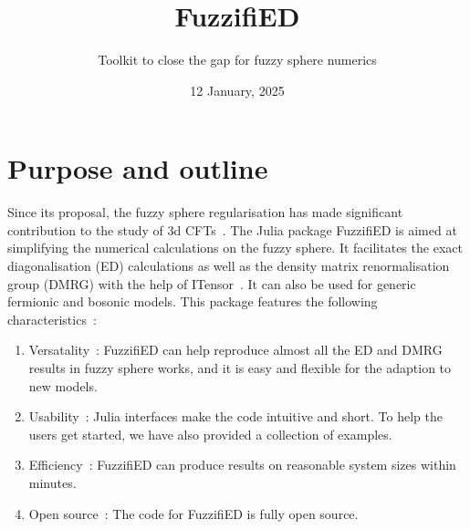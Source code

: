 \documentclass{timesjhep}
\title{FuzzifiED}
\subtitle{Toolkit to close the gap for fuzzy sphere numerics}
\date{12 January, 2025}
\begin{document}
\maketitle

\section{Purpose and outline}

Since its proposal, the fuzzy sphere regularisation has made significant contribution to the study of 3d CFTs~\cite{Zhu2022,Hu2023Mar,Han2023Jun,Zhou2023,Lao2023,Hu2023Aug,Hofmann2023,Han2023Dec,Zhou2024Jan,Hu2024,Cuomo2024,Zhou2024Jul,Dedushenko2024,Fardelli2024,Fan2024,Zhou2024Oct,Voinea2024}. The Julia package FuzzifiED is aimed at simplifying the numerical calculations on the fuzzy sphere. It facilitates the exact diagonalisation (ED) calculations as well as the density matrix renormalisation group (DMRG) with the help of ITensor~\cite{ITensor}. It can also be used for generic fermionic and bosonic models. This package features the following characteristics~: 
\begin{enumerate}
    \item Versatality~: FuzzifiED can help reproduce almost all the ED and DMRG results in fuzzy sphere works, and it is easy and flexible for the adaption to new models. 
    \item Usability~: Julia interfaces make the code intuitive and short. To help the users get started, we have also provided a collection of examples.
    \item Efficiency~: FuzzifiED can produce results on reasonable system sizes within minutes.
    \item Open source~: The code for FuzzifiED is fully open source. 
\end{enumerate}
\end{document}

